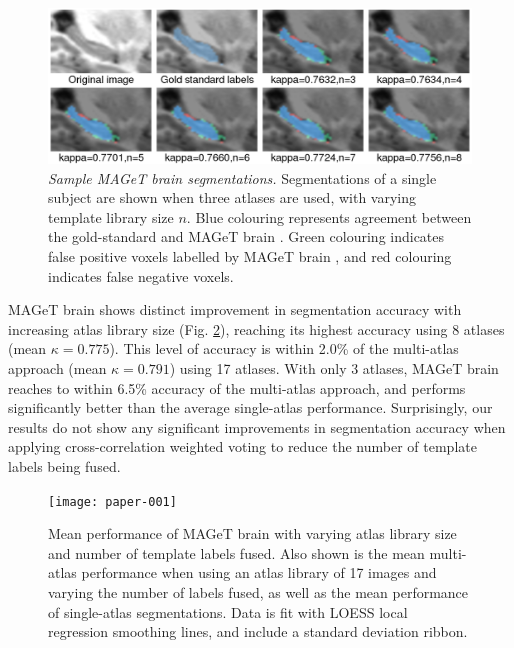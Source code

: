 \documentclass{article}
\newcommand{\magetbrain}{MAGeT brain }
\begin{document}
\begin{figure}[h]
\begin{minipage}[b]{1.0\linewidth}
  \centering
  \includegraphics[width=\textwidth]{montage.png}
\end{minipage}
\caption{{\em Sample \magetbrain segmentations.} 
Segmentations of a single subject are shown when three atlases are used, with
varying template library size $n$. Blue colouring represents agreement between
the gold-standard and \magetbrain. Green colouring indicates false positive
voxels labelled by \magetbrain, and red colouring indicates false negative
voxels.
} 
\label{montage}
\end{figure}

\magetbrain shows distinct improvement in segmentation accuracy with increasing
atlas library size (Fig. \ref{results}), reaching its highest accuracy using 8
atlases (mean $\kappa = 0.775$).  This level of accuracy is within 2.0\% of the
multi-atlas approach (mean $\kappa = 0.791$) using 17 atlases. With only 3
atlases, \magetbrain reaches to within 6.5\% accuracy of the multi-atlas
approach, and performs significantly better than the average single-atlas
performance. Surprisingly, our results do not show any significant improvements
in segmentation accuracy when applying cross-correlation weighted voting to
reduce the number of template labels being fused.

\begin{figure}
\begin{minipage}[b]{1.0\linewidth}
  \centering
\texttt{[image: paper-001]}
\end{minipage}
\caption{
Mean performance of \magetbrain with varying atlas library size and number of
template labels fused. Also shown is the mean multi-atlas performance when
using an atlas library of 17 images and varying the number of labels fused, as
well as the mean performance of single-atlas segmentations.  Data is fit with
LOESS local regression smoothing lines, and include a standard deviation
ribbon.
}
\label{results}
\end{figure}
\end{document}
